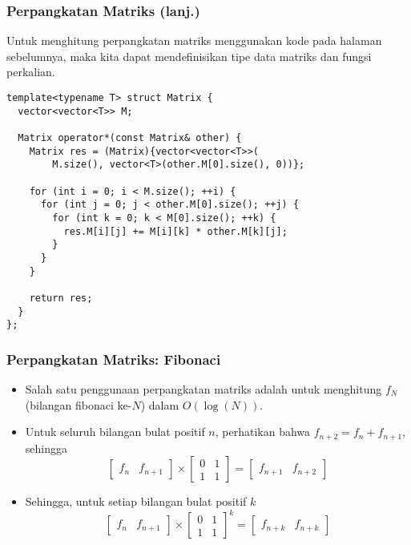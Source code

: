 \begin{frame}[fragile]
\frametitle{Perpangkatan Matriks (lanj.)}
Untuk menghitung perpangkatan matriks menggunakan kode pada halaman sebelumnya, maka kita dapat mendefinisikan tipe data matriks dan fungsi perkalian.
\begin{lstlisting}
template<typename T> struct Matrix {
  vector<vector<T>> M;

  Matrix operator*(const Matrix& other) {
    Matrix res = (Matrix){vector<vector<T>>(
        M.size(), vector<T>(other.M[0].size(), 0))};

    for (int i = 0; i < M.size(); ++i) {
      for (int j = 0; j < other.M[0].size(); ++j) {
        for (int k = 0; k < M[0].size(); ++k) {
          res.M[i][j] += M[i][k] * other.M[k][j];
        }
      }
    }

    return res;
  }
};
\end{lstlisting}
\end{frame}

\begin{frame}
\frametitle{Perpangkatan Matriks: Fibonaci}
\begin{itemize}
  \item Salah satu penggunaan perpangkatan matriks adalah untuk menghitung $f_N$ (bilangan fibonaci ke-$N$) dalam $O(\log(N))$.
  \item Untuk seluruh bilangan bulat positif $n$, perhatikan bahwa $f_{n+2} = f_n + f_{n+1}$, sehingga
\[
  \begin{bmatrix} f_n & f_{n+1} \end{bmatrix} \times
  \begin{bmatrix} 0 & 1 \\ 1 & 1  \end{bmatrix} =
  \begin{bmatrix} f_{n+1} & f_{n+2} \end{bmatrix}
\]
  \item Sehingga, untuk setiap bilangan bulat positif $k$
\[
  \begin{bmatrix} f_n & f_{n+1} \end{bmatrix} \times
  \begin{bmatrix} 0 & 1 \\ 1 & 1  \end{bmatrix}^k =
  \begin{bmatrix} f_{n+k} & f_{n+k} \end{bmatrix}
\]
\end{itemize}
\end{frame}

